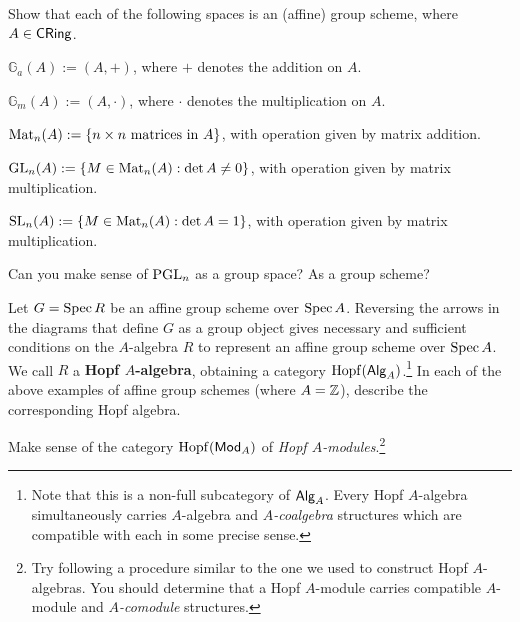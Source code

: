 \documentclass[11pt]{article}
\newcommand{\G}{\mathbb{G}}
\DeclareMathOperator{\Hopf}{Hopf} %
\begin{document}
\begin{exercise}
Show that each of the following spaces is an (affine) group scheme, where $A\in\operatorname{\mathsf{CRing}}$.
\begin{enum}{\arabic}
\item $\G_a(A):=(A,+)$, where $+$ denotes the addition on $A$.

\item $\G_m(A):=(A,\cdot)$, where $\cdot$ denotes the multiplication on $A$.

\item $\operatorname{Mat}_n(A):=\{n\times n\textrm{ matrices in }A\}$, with operation given by matrix addition.

\item $\textup{GL}_n(A):=\{M\in\operatorname{Mat}_n(A) : \det A\neq0\}$, with operation given by matrix multiplication.

\item $\textup{SL}_n(A):=\{M\in\operatorname{Mat}_n(A) : \det A=1\}$, with operation given by matrix multiplication.
\end{enum}
\end{exercise}

\begin{exercise}
Can you make sense of $\textup{PGL}_n$ as a group space? As a group scheme?
\end{exercise}

\begin{exercise}
Let $G=\operatorname{Spec} R$ be an affine group scheme over $\operatorname{Spec} A$. Reversing the arrows in the diagrams that define $G$ as a group object gives necessary and sufficient conditions on the $A$-algebra $R$ to represent an affine group scheme over $\operatorname{Spec} A$. We call $R$ a \textbf{Hopf $A$-algebra}, obtaining a category $\Hopf(\Alg_A)$.\footnote{Note that this is a non-full subcategory of $\operatorname{\mathsf{Alg}}_A$. Every Hopf $A$-algebra simultaneously carries $A$-algebra and \emph{$A$-coalgebra} structures which are compatible with each in some precise sense.} In each of the above examples of affine group schemes (where $A=\mathbb{Z}$), describe the corresponding Hopf algebra.
\end{exercise}

\begin{exercise}
Make sense of the category $\Hopf(\Mod_A)$ of \emph{Hopf $A$-modules}.\footnote{Try following a procedure similar to the one we used to construct Hopf $A$-algebras. You should determine that a Hopf $A$-module carries compatible $A$-module and \emph{$A$-comodule} structures.}
\end{exercise}
\end{document}
